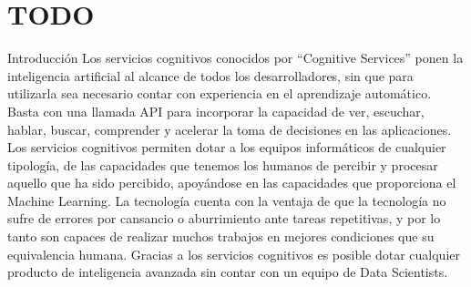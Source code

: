 \section{TODO}

Introducción
Los servicios cognitivos conocidos por “Cognitive Services” ponen la inteligencia artificial al alcance de todos los desarrolladores, sin que para utilizarla sea necesario contar con experiencia en el aprendizaje automático. Basta con una llamada API para incorporar la capacidad de ver, escuchar, hablar, buscar, comprender y acelerar la toma de decisiones en las aplicaciones. 
Los servicios cognitivos permiten dotar a los equipos informáticos de cualquier tipología, de las capacidades que tenemos los humanos de percibir y procesar aquello que ha sido percibido, apoyándose en las capacidades que proporciona el Machine Learning. La tecnología cuenta con la ventaja de que la tecnología no sufre de errores por cansancio o aburrimiento ante tareas repetitivas, y por lo tanto son capaces de realizar muchos trabajos en mejores condiciones que su equivalencia humana. Gracias a los servicios cognitivos es posible dotar cualquier producto de inteligencia avanzada sin contar con un equipo de Data Scientists.

